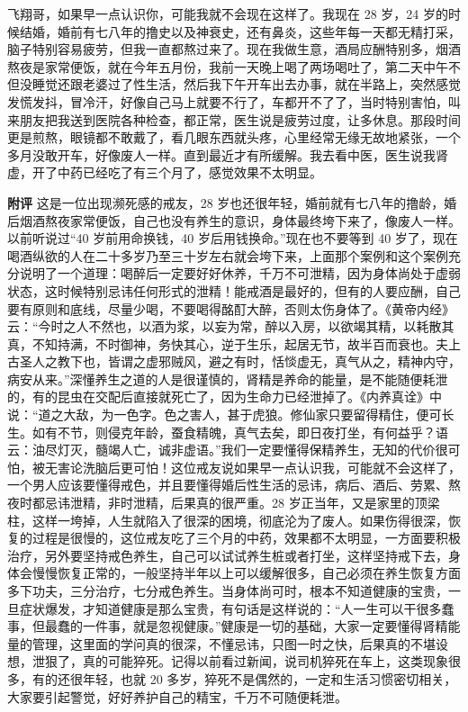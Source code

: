 \begin{case}
    飞翔哥，如果早一点认识你，可能我就不会现在这样了。我现在 28 岁，24 岁的时候结婚，婚前有七八年的撸史以及神衰史，还有鼻炎，这些年每一天都无精打采，脑子特别容易疲劳，但我一直都熬过来了。现在我做生意，酒局应酬特别多，烟酒熬夜是家常便饭，就在今年五月份，我前一天晚上喝了两场喝吐了，第二天中午不但没睡觉还跟老婆过了性生活，然后我下午开车出去办事，就在半路上，突然感觉发慌发抖，冒冷汗，好像自己马上就要不行了，车都开不了了，当时特别害怕，叫来朋友把我送到医院各种检查，都正常，医生说是疲劳过度，让多休息。那段时间更是煎熬，眼镜都不敢戴了，看几眼东西就头疼，心里经常无缘无故地紧张，一个多月没敢开车，好像废人一样。直到最近才有所缓解。我去看中医，医生说我肾虚，开了中药已经吃了有三个月了，感觉效果不太明显。

    \textbf{附评} 这是一位出现濒死感的戒友，28 岁也还很年轻，婚前就有七八年的撸龄，婚后烟酒熬夜家常便饭，自己也没有养生的意识，身体最终垮下来了，像废人一样。以前听说过“40 岁前用命换钱，40 岁后用钱换命。”现在也不要等到 40 岁了，现在喝酒纵欲的人在二十多岁乃至三十岁左右就会垮下来，上面那个案例和这个案例充分说明了一个道理：喝醉后一定要好好休养，千万不可泄精，因为身体尚处于虚弱状态，这时候特别忌讳任何形式的泄精！能戒酒是最好的，但有的人要应酬，自己要有原则和底线，尽量少喝，不要喝得酩酊大醉，否则太伤身体了。《黄帝内经》云：“今时之人不然也，以酒为浆，以妄为常，醉以入房，以欲竭其精，以耗散其真，不知持满，不时御神，务快其心，逆于生乐，起居无节，故半百而衰也。夫上古圣人之教下也，皆谓之虚邪贼风，避之有时，恬惔虚无，真气从之，精神内守，病安从来。”深懂养生之道的人是很谨慎的，肾精是养命的能量，是不能随便耗泄的，有的昆虫在交配后直接就死亡了，因为生命力已经泄掉了。《内养真诠》中说：“道之大敌，为一色字。色之害人，甚于虎狼。修仙家只要留得精住，便可长生。如有不节，则侵克年龄，蚕食精魄，真气去矣，即日夜打坐，有何益乎？语云：油尽灯灭，髓竭人亡，诚非虚语。”我们一定要懂得保精养生，无知的代价很可怕，被无害论洗脑后更可怕！这位戒友说如果早一点认识我，可能就不会这样了，一个男人应该要懂得戒色，并且要懂得婚后性生活的忌讳，病后、酒后、劳累、熬夜时都忌讳泄精，非时泄精，后果真的很严重。28 岁正当年，又是家里的顶梁柱，这样一垮掉，人生就陷入了很深的困境，彻底沦为了废人。如果伤得很深，恢复的过程是很慢的，这位戒友吃了三个月的中药，效果都不太明显，一方面要积极治疗，另外要坚持戒色养生，自己可以试试养生桩或者打坐，这样坚持戒下去，身体会慢慢恢复正常的，一般坚持半年以上可以缓解很多，自己必须在养生恢复方面多下功夫，三分治疗，七分戒色养生。当身体尚可时，根本不知道健康的宝贵，一旦症状爆发，才知道健康是那么宝贵，有句话是这样说的：“人一生可以干很多蠢事，但最蠢的一件事，就是忽视健康。”健康是一切的基础，大家一定要懂得肾精能量的管理，这里面的学问真的很深，不懂忌讳，只图一时之快，后果真的不堪设想，泄狠了，真的可能猝死。记得以前看过新闻，说司机猝死在车上，这类现象很多，有的还很年轻，也就 20 多岁，猝死不是偶然的，一定和生活习惯密切相关，大家要引起警觉，好好养护自己的精宝，千万不可随便耗泄。
\end{case}

